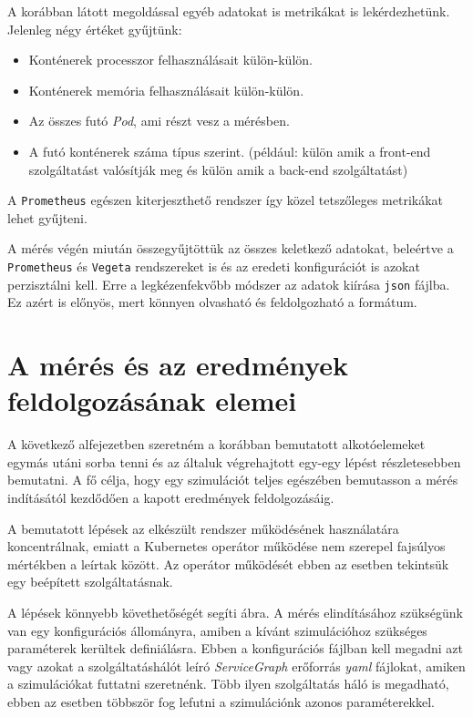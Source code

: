 

A korábban látott megoldással egyéb adatokat is metrikákat is lekérdezhetünk. Jelenleg négy értéket gyűjtünk:
\begin{itemize}
  \item Konténerek processzor felhasználásait külön-külön.
  \item Konténerek memória felhasználásait külön-külön.
  \item Az összes futó \textit{Pod}, ami részt vesz a mérésben.
  \item A futó konténerek száma típus szerint. (például: külön amik a front-end szolgáltatást valósítják meg és külön amik a back-end szolgáltatást)
\end{itemize}

A \verb+Prometheus+ egészen kiterjeszthető rendszer így közel tetszőleges metrikákat lehet gyűjteni. 


A mérés végén miután összegyűjtöttük az összes keletkező adatokat, beleértve a \verb+Prometheus+ és \verb+Vegeta+ rendszereket is és az eredeti konfigurációt is azokat perzisztálni kell. Erre a legkézenfekvőbb módszer az adatok kiírása \verb+json+ fájlba. Ez azért is előnyös, mert könnyen olvasható és feldolgozható a formátum. 

\section{A mérés és az eredmények feldolgozásának elemei}
\label{sec:measure_steps}

A következő alfejezetben szeretném a korábban bemutatott alkotóelemeket egymás utáni sorba tenni és az általuk végrehajtott egy-egy lépést részletesebben bemutatni.
A fő célja, hogy egy szimulációt teljes egészében bemutasson a mérés indításától kezdődően a kapott eredmények feldolgozásáig.

A bemutatott lépések az elkészült rendszer működésének használatára koncentrálnak, emiatt a Kubernetes operátor működése nem szerepel fajsúlyos mértékben a leírtak között.
Az operátor működését ebben az esetben tekintsük egy beépített szolgáltatásnak.

A lépések könnyebb követhetőségét segíti  ábra.
A mérés elindításához szükségünk van egy konfigurációs állományra, amiben a kívánt szimulációhoz szükséges paraméterek kerültek definiálásra.
Ebben a konfigurációs fájlban kell megadni azt vagy azokat a szolgáltatáshálót leíró \textit{ServiceGraph} erőforrás \textit{yaml} fájlokat, amiken a szimulációkat futtatni szeretnénk.
Több ilyen szolgáltatás háló is megadható, ebben az esetben többször fog lefutni a szimulációnk azonos paraméterekkel.

